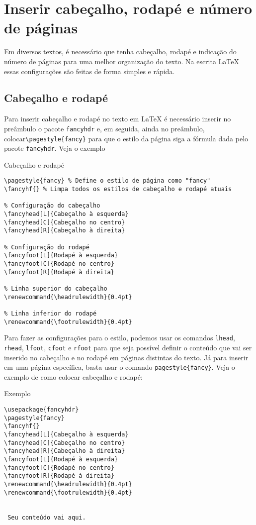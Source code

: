 \section{Inserir cabeçalho, rodapé e número de páginas}
Em diversos textos, é necessário que tenha cabeçalho, rodapé e indica\c c\~ao do número de páginas para uma melhor organização do texto. Na escrita \LaTeX{} essas configurações são feitas de forma simples e rápida.

\subsection{Cabeçalho e rodapé}
Para inserir cabeçalho e rodapé no texto em \LaTeX{} é necessário inserir no preâmbulo o pacote \verb|fancyhdr| e, em seguida, ainda no preâmbulo, colocar\verb|\pagestyle{fancy}| para que o estilo da página siga a fórmula dada pelo pacote \verb|fancyhdr|. Veja o exemplo

\begin{trailer}{Cabeçalho e rodapé}
\begin{verbatim}
\pagestyle{fancy} % Define o estilo de página como "fancy"
\fancyhf{} % Limpa todos os estilos de cabeçalho e rodapé atuais

% Configuração do cabeçalho
\fancyhead[L]{Cabeçalho à esquerda}
\fancyhead[C]{Cabeçalho no centro}
\fancyhead[R]{Cabeçalho à direita}

% Configuração do rodapé
\fancyfoot[L]{Rodapé à esquerda}
\fancyfoot[C]{Rodapé no centro}
\fancyfoot[R]{Rodapé à direita}

% Linha superior do cabeçalho
\renewcommand{\headrulewidth}{0.4pt}

% Linha inferior do rodapé
\renewcommand{\footrulewidth}{0.4pt}
\end{verbatim}
\end{trailer}

\noindent Para fazer as configurações para o estilo, podemos usar os comandos \verb|lhead|, \verb|rhead|, \verb|lfoot|, \verb|cfoot| e \verb|rfoot| para que seja possível definir o conteúdo que vai ser inserido no cabeçalho e no rodapé em páginas distintas do texto. Já para inserir em uma página específica, basta usar o comando \verb|pagestyle{fancy}|. Veja o exemplo de como colocar cabeçalho e rodapé:

\begin{trailer}{Exemplo}
\begin{verbatim}
\usepackage{fancyhdr}
\pagestyle{fancy}
\fancyhf{}
\fancyhead[L]{Cabeçalho à esquerda}
\fancyhead[C]{Cabeçalho no centro}
\fancyhead[R]{Cabeçalho à direita}
\fancyfoot[L]{Rodapé à esquerda}
\fancyfoot[C]{Rodapé no centro}
\fancyfoot[R]{Rodapé à direita}
\renewcommand{\headrulewidth}{0.4pt}
\renewcommand{\footrulewidth}{0.4pt}


 Seu conteúdo vai aqui.


\end{verbatim}
\end{trailer}

